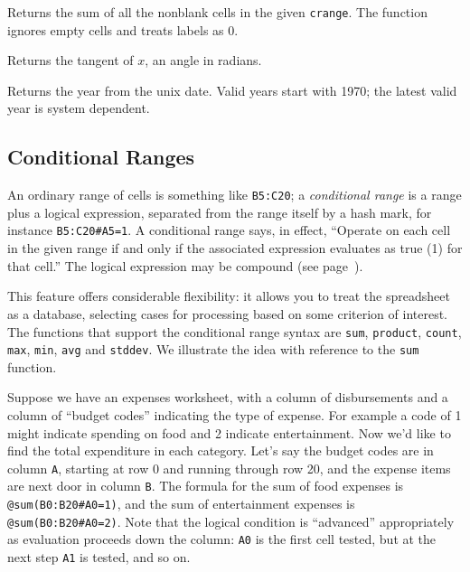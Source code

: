 \documentclass[titlepage]{article}
\begin{document}
 Returns the sum of all the nonblank cells in the
given \texttt{crange}.  The function ignores empty cells and treats
labels as 0.

 Returns the tangent of $x$, an angle in radians.

 Returns the year from the unix date.  Valid
years start with 1970; the latest valid year is system dependent.

\subsection{Conditional Ranges}
\label{condrange}

An ordinary range of cells is something like \texttt{B5:C20}; a
\textit{conditional range} is a range plus a logical expression,
separated from the range itself by a hash mark, for instance
\verb+B5:C20#A5=1+.  A conditional range says, in effect, ``Operate
on each cell in the given range if and only if the associated
expression evaluates as true (1) for that cell.''  The logical
expression may be compound (see page~\pageref{logical_ops}).

This feature offers considerable flexibility: it allows you to treat
the spreadsheet as a database, selecting cases for processing based on
some criterion of interest.  The functions that support the
conditional range syntax are \texttt{sum}, \texttt{product},
\texttt{count}, \texttt{max}, \texttt{min}, \texttt{avg} and
\texttt{stddev}.  We illustrate the idea with reference to the
\texttt{sum} function.

Suppose we have an expenses worksheet, with a column of disbursements
and a column of ``budget codes'' indicating the type of expense.  For
example a code of 1 might indicate spending on food and 2 indicate
entertainment.  Now we'd like to find the total expenditure in each
category.  Let's say the budget codes are in column \texttt{A},
starting at row 0 and running through row 20, and the expense items
are next door in column \texttt{B}.  The formula for the sum of food
expenses is \verb+@sum(B0:B20#A0=1)+, and the sum of entertainment
expenses is \verb+@sum(B0:B20#A0=2)+.  Note that the logical condition
is ``advanced'' appropriately as evaluation proceeds down the column:
\texttt{A0} is the first cell tested, but at the next step \texttt{A1}
is tested, and so on.
\end{document}
